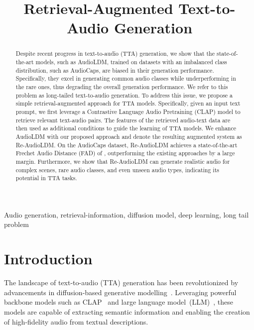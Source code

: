 \documentclass{article}
\title{Retrieval-Augmented Text-to-Audio Generation}
\begin{document}
\maketitle

\begin{abstract}
Despite recent progress in text-to-audio (TTA) generation, we show that the state-of-the-art models, such as AudioLDM, trained on datasets with an imbalanced class distribution, such as AudioCaps, are biased in their generation performance. Specifically, they excel in generating common audio classes while underperforming in the rare ones, thus degrading the overall generation performance. We refer to this problem as long-tailed text-to-audio generation. To address this issue, we propose a simple retrieval-augmented approach for TTA models. Specifically, given an input text prompt, we first leverage a Contrastive Language Audio Pretraining (CLAP) model to retrieve relevant text-audio pairs. The features of the retrieved audio-text data are then used as additional conditions to guide the learning of TTA models. We enhance AudioLDM with our proposed approach and denote the resulting augmented system as Re-AudioLDM. On the AudioCaps dataset, Re-AudioLDM achieves a state-of-the-art Frechet Audio Distance (FAD) of , outperforming the existing approaches by a large margin. Furthermore, we show that Re-AudioLDM can generate realistic audio for complex scenes, rare audio classes, and even unseen audio types, indicating its potential in TTA tasks.
\end{abstract}


\begin{keywords}
	Audio generation, retrieval-information, diffusion model, deep learning, long tail problem
\end{keywords}



\section{Introduction}
\label{sec:intro}
The landscape of text-to-audio (TTA) generation has been revolutionized by advancements in diffusion-based generative modelling~\cite{audioldm,makeaudio,wavjourney}. Leveraging powerful backbone models such as CLAP~\cite{audioldm} and large language model~(LLM)~\cite{tango}, these models are capable of extracting semantic information and enabling the creation of high-fidelity audio from textual descriptions. 
\end{document}
